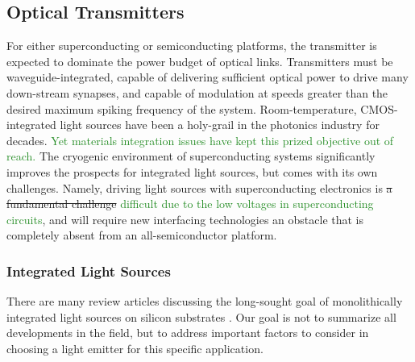 \documentclass[twocolumn]{article}
\begin{document}
\subsection{Optical Transmitters}
For either superconducting or semiconducting platforms, the transmitter is expected to dominate the power budget of optical links. Transmitters must be waveguide-integrated, capable of delivering sufficient optical power to drive many down-stream synapses, and capable of modulation at speeds greater than the desired maximum spiking frequency of the system. Room-temperature, CMOS-integrated light sources have been a holy-grail in the photonics industry for decades. \textcolor{ForestGreen}{Yet materials integration issues have kept this prized objective out of reach.} The cryogenic environment of superconducting systems significantly improves the prospects for integrated light sources, but comes with its own challenges. Namely, driving light sources with superconducting electronics is \sout{a fundamental challenge} \textcolor{ForestGreen}{difficult due to the low voltages in superconducting circuits}, and will require new interfacing technologies\cite{} \textemsash an obstacle that is completely absent from an all-semiconductor platform.

\subsubsection{Integrated Light Sources}
There are many review articles discussing the long-sought goal of monolithically integrated light sources on silicon substrates \cite{}. Our goal is not to summarize all developments in the field, but to address important factors to consider in choosing a light emitter for this specific application.
\end{document}
